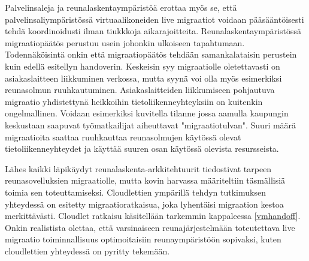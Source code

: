 Palvelinsaleja ja reunalaskentaympäristöä erottaa myös se, että palvelinsaliympäristössä virtuaalikoneiden live migraatiot voidaan pääsääntöisesti tehdä koordinoidusti ilman tiukkkoja aikarajoitteita. 
Reunalaskentaympäristössä migraatiopäätös perustuu usein johonkin ulkoiseen tapahtumaan. Todennäköisintä onkin että migraatiopäätös tehdään samankalataisin perustein kuin edellä esitellyn handoverin. Keskeisin syy migraatiolle oletettavasti on asiakaslaitteen liikkuminen verkossa, mutta syynä voi olla myös esimerkiksi reunasolmun ruuhkautuminen. Asiakaslaitteiden liikkumiseen pohjautuva migraatio yhdistettynä heikkoihin tietoliikenneyhteyksiin on kuitenkin ongelmallinen. Voidaan esimerkiksi kuvitella tilanne jossa aamulla kaupungin keskustaan saapuvat työmatkailijat aiheuttavat "migraatiotulvan". Suuri määrä migraatioita saattaa ruuhkauttaa reunasolmujen käytössä olevat tietoliikenneyhteydet ja käyttää suuren osan käytössä olevista resursseista. 


Lähes kaikki läpikäydyt reunalaskenta-arkkitehtuurit tiedostivat tarpeen reunasovelluksien migraatiolle, mutta kovin harvassa määriteltiin täsmällisiä toimia sen toteuttamiseksi.
Cloudlettien ympärillä tehdyn tutkimuksen yhteydessä on esitetty migraatioratkaisua, joka lyhentäisi migraation kestoa merkittävästi. Cloudlet ratkaisu käsitellään tarkemmin kappaleessa \ref{vmhandoff}. 
Onkin realistista olettaa, että varsinaiseen reunajärjestelmään toteutettava live migraatio toiminnallisuus optimoitaisiin reunaympäristöön sopivaksi, kuten cloudlettien yhteydessä on pyritty tekemään. 
